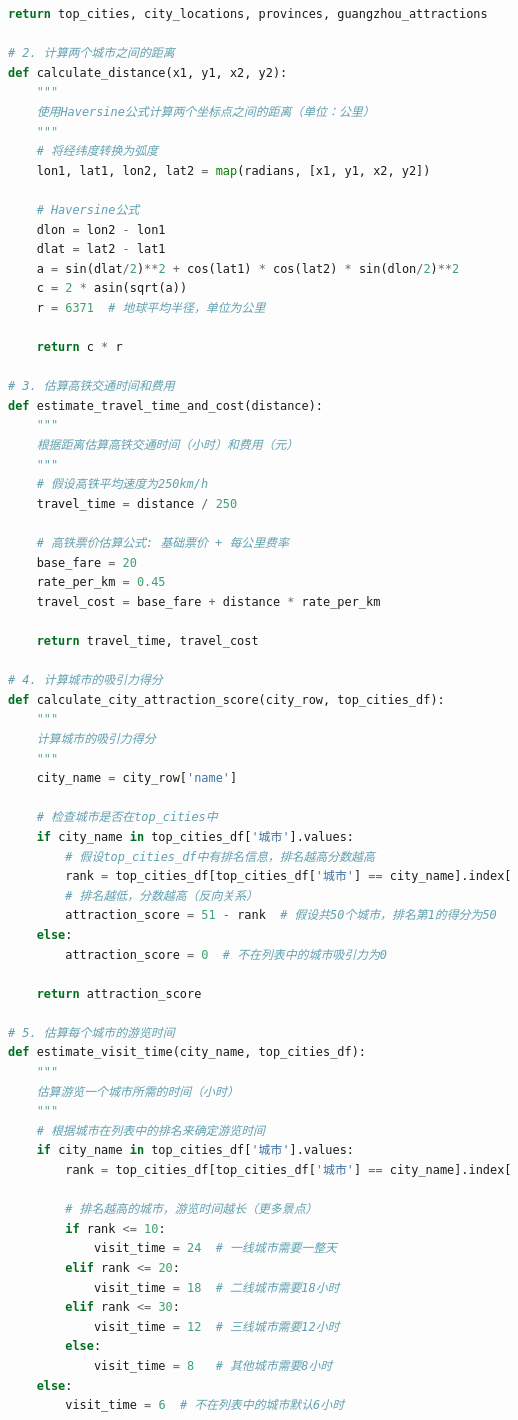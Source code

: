 \documentclass[withoutpreface,bwprint]{cumcmthesis} %
\begin{document}
\begin{appendices}
\begin{lstlisting}[language=python]
    return top_cities, city_locations, provinces, guangzhou_attractions

# 2. 计算两个城市之间的距离
def calculate_distance(x1, y1, x2, y2):
    """
    使用Haversine公式计算两个坐标点之间的距离（单位：公里）
    """
    # 将经纬度转换为弧度
    lon1, lat1, lon2, lat2 = map(radians, [x1, y1, x2, y2])
    
    # Haversine公式
    dlon = lon2 - lon1
    dlat = lat2 - lat1
    a = sin(dlat/2)**2 + cos(lat1) * cos(lat2) * sin(dlon/2)**2
    c = 2 * asin(sqrt(a))
    r = 6371  # 地球平均半径，单位为公里
    
    return c * r

# 3. 估算高铁交通时间和费用
def estimate_travel_time_and_cost(distance):
    """
    根据距离估算高铁交通时间（小时）和费用（元）
    """
    # 假设高铁平均速度为250km/h 
    travel_time = distance / 250
    
    # 高铁票价估算公式: 基础票价 + 每公里费率 
    base_fare = 20
    rate_per_km = 0.45
    travel_cost = base_fare + distance * rate_per_km
    
    return travel_time, travel_cost

# 4. 计算城市的吸引力得分
def calculate_city_attraction_score(city_row, top_cities_df):
    """
    计算城市的吸引力得分
    """
    city_name = city_row['name']
    
    # 检查城市是否在top_cities中
    if city_name in top_cities_df['城市'].values:
        # 假设top_cities_df中有排名信息，排名越高分数越高
        rank = top_cities_df[top_cities_df['城市'] == city_name].index[0] + 1
        # 排名越低，分数越高（反向关系）
        attraction_score = 51 - rank  # 假设共50个城市，排名第1的得分为50
    else:
        attraction_score = 0  # 不在列表中的城市吸引力为0
    
    return attraction_score

# 5. 估算每个城市的游览时间
def estimate_visit_time(city_name, top_cities_df):
    """
    估算游览一个城市所需的时间（小时）
    """
    # 根据城市在列表中的排名来确定游览时间
    if city_name in top_cities_df['城市'].values:
        rank = top_cities_df[top_cities_df['城市'] == city_name].index[0] + 1
        
        # 排名越高的城市，游览时间越长（更多景点）
        if rank <= 10:
            visit_time = 24  # 一线城市需要一整天
        elif rank <= 20:
            visit_time = 18  # 二线城市需要18小时
        elif rank <= 30:
            visit_time = 12  # 三线城市需要12小时
        else:
            visit_time = 8   # 其他城市需要8小时
    else:
        visit_time = 6  # 不在列表中的城市默认6小时
    

\end{lstlisting}
\end{appendices}
\end{document}
